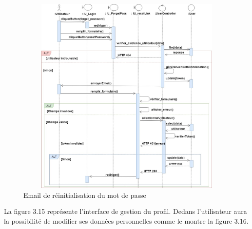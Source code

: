 \begin{figure}[H]
\centering
\includegraphics[height=10cm,width=15cm]{resetpassword.jpg}
\caption{ Email de réinitialisation du mot de passe }
\label{Email de réinitialisation du mot de passe}
\end{figure}
La figure 3.15 représente l'interface de gestion du profil. Dedans l'utilisateur aura la possibilité de modifier ses données personnelles comme le montre la figure 3.16.


